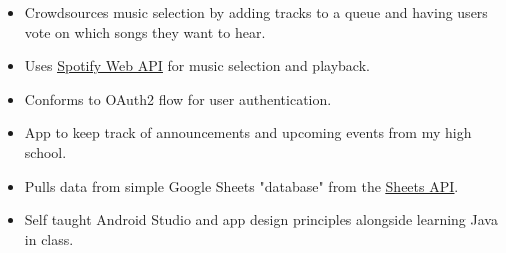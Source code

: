 \documentclass[10pt,a4paper,ragged2e]{altacv}
\begin{document}
\divider

\begin{itemize}
    \item Crowdsources music selection by adding tracks to a queue and having users vote on which songs they want to hear.
    \smallskip
    \item Uses \underline{\href{https://developer.spotify.com/documentation/web-api/}{Spotify Web API}} for music selection and playback.
    \smallbreak
    \item Conforms to OAuth2 flow for user authentication.
\end{itemize}

\divider

\begin{itemize}
    \item App to keep track of announcements and upcoming events from my high school.
    \smallskip
    \item Pulls data from simple Google Sheets "database" from the \underline{\href{https://developers.google.com/sheets/api}{Sheets API}}.
    \smallskip
    \item Self taught Android Studio and app design principles alongside learning Java in class.
\end{itemize}

\clearpage
\end{document}
